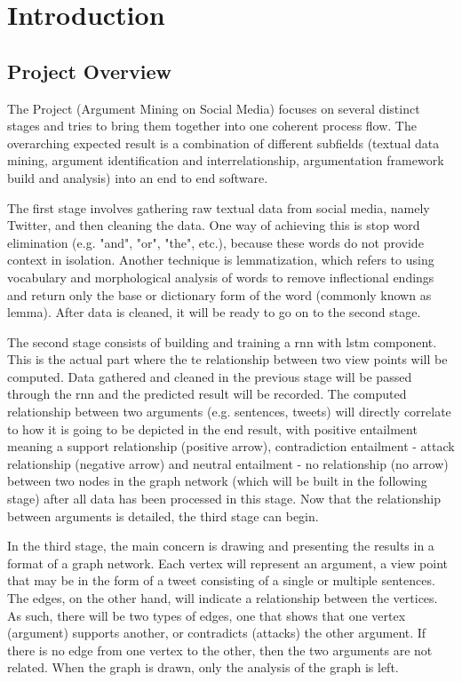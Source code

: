 \section{Introduction}
    \subsection{Project Overview}
     The Project (Argument Mining on Social Media) focuses on several distinct stages and tries to bring them together into one coherent process flow. The overarching expected result is a combination of different subfields (textual data mining, argument identification and interrelationship, argumentation framework build and analysis) into an end to end software. 
     
     The first stage involves gathering raw textual data from social media, namely Twitter, and then cleaning the data. One way of achieving this is stop word elimination (e.g. "and", "or", "the", etc.), because these words do not provide context in isolation. Another technique is lemmatization, which refers to using vocabulary and morphological analysis of words to remove inflectional endings and return only the base or dictionary form of the word (commonly known as lemma). After data is cleaned, it will be ready to go on to the second stage.
     
     The second stage consists of building and training a \gls{rnn} with \gls{lstm} component. This is the actual part where the \gls{te} relationship between two view points will be computed. Data gathered and cleaned in the previous stage will be passed through the \gls{rnn} and the predicted result will be recorded. The computed relationship between two arguments (e.g. sentences, tweets) will directly correlate to how it is going to be depicted in the end result, with positive entailment meaning a support relationship (positive arrow), contradiction entailment - attack relationship (negative arrow) and neutral entailment - no relationship (no arrow) between two nodes in the graph network (which will be built in the following stage) after all data has been processed in this stage. Now that the relationship between arguments is detailed, the third stage can begin.
     
     In the third stage, the main concern is drawing and presenting the results in a format of a graph network. Each vertex will represent an argument, a view point that may be in the form of a tweet consisting of a single or multiple sentences. The edges, on the other hand, will indicate a relationship between the vertices. As such, there will be two types of edges, one that shows that one vertex (argument) supports another, or contradicts (attacks) the other argument. If there is no edge from one vertex to the other, then the two arguments are not related. When the graph is drawn, only the analysis of the graph is left.
     
